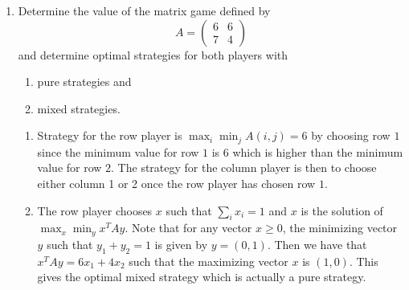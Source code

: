 \documentclass[11pt]{article}
\institute{\'Ecole Polytechnique F\'ed\'erale de Lausanne}
\renewcommand{\geq}{\geqslant}
\begin{document}
\makeheader

\begin{enumerate}[1)]
\item Determine the value of the matrix game defined by 
  \begin{displaymath}
    A =
    \begin{pmatrix}
      6 & 6 \\
      7 & 4
    \end{pmatrix}
  \end{displaymath}
and determine optimal strategies for both players with
\begin{enumerate}
\item pure strategies and 
\item mixed strategies.
\end{enumerate} 


\begin{solution}
\begin{enumerate}
\item Strategy for the row player is $\max_i \min_j A(i, j) = 6$ by choosing row $1$ since the minimum value for row $1$ is $6$ which is higher than the minimum value for row $2$. The strategy for the column player is then to choose either column 1 or 2 once the row player has chosen row $1$. 

\item The row player chooses $x$ such that $\sum_i x_i = 1$ and $x$ is the solution of $\max_x \min_y x^TAy$. Note that for any vector $x \geq 0$, the minimizing vector $y$ such that $y_1 + y_2 = 1$ is given by $y = (0, 1)$. Then we have that $x^TAy = 6x_1 + 4x_2$ such that the maximizing vector $x$ is $(1, 0)$. This gives the optimal mixed strategy which is actually a pure strategy.  
\end{enumerate}
\end{solution}


\end{enumerate}
\end{document}
